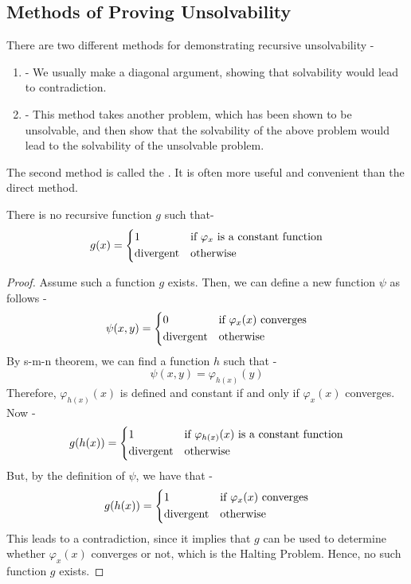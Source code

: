 \documentclass[openany]{book}
\begin{document}
\subsection{Methods of Proving Unsolvability}
There are two different methods for demonstrating recursive unsolvability - 
\begin{enumerate}
    \item {}- We usually make a diagonal argument, showing that solvability would lead to contradiction. \\
    \begin{example}
    \end{example} 
    \item {}- This method takes another problem, which has been shown to be unsolvable, and then show that the solvability of the above problem would lead to the solvability of the unsolvable problem. \\
    \begin{example}[Theorem 1.16]
    \end{example} 
\end{enumerate}
The second method is called the . It is often more useful and convenient than the direct method. 
\begin{mytheorem}[Unsolvable (a)]
    There is no recursive function $g$ such that-
    $$g(x) = \begin{dcases}
        \text{1} & \text{if } \varphi_x \text{ is a constant function} \\
        \text{divergent} & \text{otherwise}
    \end{dcases}$$
\end{mytheorem}
\begin{proof}
    Assume such a function $g$ exists. Then, we can define a new function $\psi$ as follows - 
    $$\psi(x, y) = \begin{dcases}
        \text{0} & \text{if } \varphi_x (x) \text{ converges} \\
        \text{divergent} & \text{otherwise}
    \end{dcases}$$
    By s-m-n theorem, we can find a function $h$ such that - 
    $$\psi(x, y) = \varphi_{h(x)}(y)$$
    Therefore, $\varphi_{h(x)}(x)$ is defined and constant if and only if $\varphi_x(x)$ converges.
    Now - 
    $$g(h(x)) = \begin{dcases}
        \text{1} & \text{if } \varphi_{h(x)}(x) \text{ is a constant function} \\
        \text{divergent} & \text{otherwise}
    \end{dcases}$$
    But, by the definition of $\psi$, we have that -
    $$g(h(x)) = \begin{dcases}
        \text{1} & \text{if } \varphi_{x}(x) \text{ converges} \\
        \text{divergent} & \text{otherwise}
    \end{dcases}$$
    This leads to a contradiction, since it implies that $g$ can be used to determine whether $\varphi_x(x)$ converges or not, which is the Halting Problem. Hence, no such function $g$ exists.
\end{proof}
\end{document}
